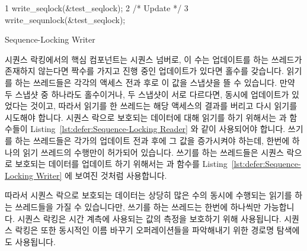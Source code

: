 \begin{listing}[bp]
{ \scriptsize
\begin{verbbox}
  1 write_seqlock(&test_seqlock);
  2 /* Update */
  3 write_sequnlock(&test_seqlock);
\end{verbbox}
}
\centering
\theverbbox
\caption{Sequence-Locking Writer}
\label{lst:defer:Sequence-Locking Writer}
\end{listing}

시퀀스 락킹에서의 핵심 컴포넌트는 시퀀스 넘버로, 이 수는 업데이트를 하는
쓰레드가 존재하지 않는다면 짝수를 가지고 진행 중인 업데이트가 있다면 홀수를
갖습니다.
읽기를 하는 쓰레드들은 각각의 액세스 전과 후로 이 값을 스냅샷을 뜰 수 있습니다.
만약 두 스냅샷 중 하나라도 홀수이거나, 두 스냅샷이 서로 다르다면, 동시에
업데이트가 있었다는 것이고, 따라서 읽기를 한 쓰레드는 해당 액세스의 결과를
버리고 다시 읽기를 시도해야 합니다.
시퀀스 락으로 보호되는 데이터에 대해 읽기를 하기 위해서는 
과  함수들이 Listing~\ref{lst:defer:Sequence-Locking Reader}
와 같이 사용되어야 합니다.
쓰기를 하는 쓰레드들은 각가의 업데이트 전과 후에 그 값을 증가시켜야 하는데,
한번에 하나의 읽기 쓰레드의 수행만이 허가되어 있습니다.
쓰기를 하는 쓰레드들은 시퀀스 락으로 보호되는 데이터를 업데이트 하기 위해서는
 과  함수를
Listing~\ref{lst:defer:Sequence-Locking Writer} 에 보여진 것처럼 사용합니다.

따라서 시퀀스 락으로 보호되는 데이터는 상당히 많은 수의 동시에 수행되는 읽기를
하는 쓰레드들을 가질 수 있습니다만, 쓰기를 하는 쓰레드는 한번에 하나씩만
가능합니다.
시퀀스 락킹은 시간 계측에 사용되는 값의 측정을 보호하기 위해 사용됩니다.
시퀀스 락킹은 또한 동시적인 이름 바꾸기 오퍼레이션들을 파악해내기 위한 경로명
탐색에도 사용됩니다.
\iffalse

